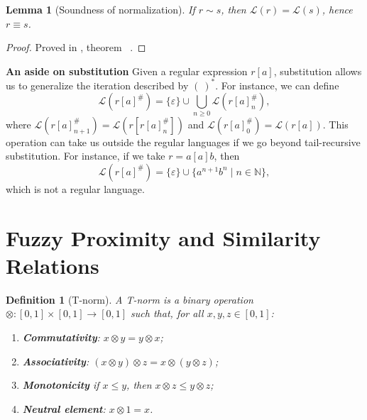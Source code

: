 \documentclass{article}
\newtheorem{definition}{Definition}[section]
\newtheorem{lemma}{Lemma}[section]
\begin{document}
\begin{lemma}[Soundness of normalization]\label{lem:similarity-sound}
If $r \sim s$, then $\mathcal{L}(r)=\mathcal{L}(s)$, hence $r \equiv s$.
\end{lemma}
\begin{proof}
\begin{sloppypar}
Proved in , theorem
~\cite{OurRocqRepo}.
\end{sloppypar}
\end{proof}

{\bf An aside on substitution} \label{extension}
Given a regular expression $r[a]$, substitution allows us to generalize the iteration described by $(\ )^\ast$. For instance, we can define
\[
\mathcal{L}(r[a]^\#)= \{\varepsilon\}\cup \bigcup_{n \geq 0} \mathcal{L}(r[a]^\#_n),
\]
where $\mathcal L(r[a]^\#_{n+1})=\mathcal L(r[r[a]^\#_n])$ and
$\mathcal{L}(r[a]^\#_0)=\mathcal L(r[a])$. This operation can take us outside the regular languages if we go beyond tail-recursive substitution. For instance, if we take $r=a[a]b$, then
\[
\mathcal{L}(r[a]^\#)= \{\varepsilon\}\cup \{ a^{n+1}b^n\mid n\in \mathbb{N}\},
\]
which is not a regular language.


\section{Fuzzy Proximity and Similarity Relations}



\begin{definition}[T-norm]
A \emph{T-norm} is a binary operation
$\otimes:[0,1]\times[0,1]\to[0,1]$ such that, for all
$x,y,z\in[0,1]$:
\begin{enumerate}
  \item{\bf Commutativity}: $x\otimes y = y\otimes x$;
  \item {\bf Associativity}: $(x\otimes y)\otimes z = x\otimes (y\otimes z)$;
  \item {\bf Monotonicity} if $x\le y$, then $x\otimes z \le y\otimes z$;
  \item {\bf Neutral element}: $x\otimes 1 = x$.
\end{enumerate}
\end{definition}
\end{document}
